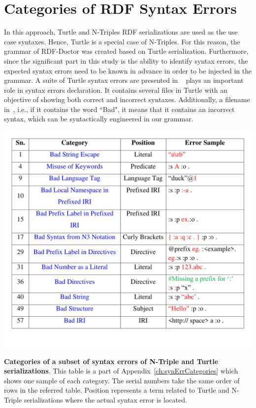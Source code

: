 \section{Categories of RDF Syntax Errors}

In this approach, Turtle and N-Triples RDF serializations are used as the use case syntaxes. 
Hence, Turtle is a special case of N-Triples. For this reason, the grammar of RDF-Doctor was created based on Turtle serialization. 
Furthermore, since the significant part in this study is the ability to identify syntax errors, the expected syntax errors need to be known in advance in order to be injected in the grammar. 
A suite of Turtle syntax errors are presented in ~\cite{TurtleTests:Online} plays an important role in syntax errors declaration. It contains several files in Turtle with an objective of showing both correct and incorrect syntaxes. Additionally, a filename in~\cite{TurtleTests:Online}, i.e., if it contains the word ``Bad", it means that it contains an incorrect syntax, which can be syntactically engineered in our grammar.

 \begin{table}[tbp]
 	\centering
\includegraphics[width=5.5in]{images/TrimmedBigTable.pdf}
		\setlength\abovecaptionskip{-10mm}
	\caption{\textbf{Categories of a subset of syntax errors of N-Triple and Turtle serializations}.
	This table is a part of Appendix~\ref{ch:synErrCategories} which shows one sample of each category. The serial numbers take the same order of rows in the referred table. 
	Position represents a term related to Turtle and N-Triple serializations where the actual syntax error is located.}
	\label{tab:trimmedTable}
\end{table}


